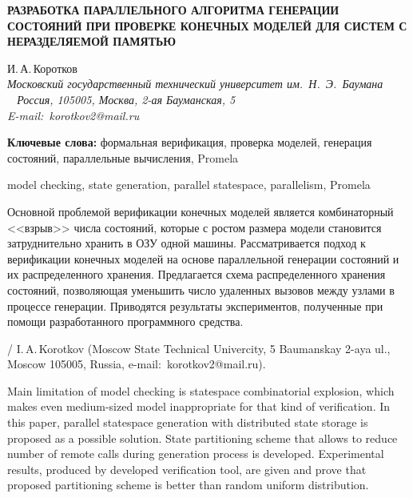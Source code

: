 \documentclass[12pt,a4paper,fleqn]{article}
\begin{document}
\begin{center}{ \fontsize{18pt}{23pt}\selectfont\bf РАЗРАБОТКА ПАРАЛЛЕЛЬНОГО АЛГОРИТМА ГЕНЕРАЦИИ СОСТОЯНИЙ ПРИ ПРОВЕРКЕ
    КОНЕЧНЫХ МОДЕЛЕЙ ДЛЯ СИСТЕМ С НЕРАЗДЕЛЯЕМОЙ ПАМЯТЬЮ}
\end{center}

\vspace{5mm}

\begin{center}
И.\,А.\,Коротков\\
\footnotesize\it Московский государственный технический университет им.~Н.~Э.~Баумана\\\
\rm
Россия, 105005, Москва, 2-ая Бауманская, 5\\
E-mail:~korotkov2@mail.ru

\hspace{1.25cm}

\vspace{8mm}

\begin{minipage}{12.16cm}\noindent

\footnotesize{\bf Ключевые слова:} формальная верификация, проверка моделей, генерация состояний, параллельные
вычисления, Promela

 model checking, state generation, parallel statespace, parallelism, Promela

\vspace{6mm}

\noindent Основной проблемой верификации конечных моделей является комбинаторный <<взрыв>> числа состояний, которые с
ростом размера модели становится затруднительно хранить в ОЗУ одной машины. Рассматривается подход к верификации
конечных моделей на основе параллельной генерации состояний и их распределенного хранения. Предлагается схема
распределенного хранения состояний, позволяющая уменьшить число удаленных вызовов между узлами в процессе
генерации. Приводятся результаты экспериментов, полученные при помощи разработанного программного средства.

\vspace{4mm}

 /
I.\,A.\,Korotkov (Moscow State Technical Univercity, 5 Baumanskay 2-aya ul., Moscow 105005, Russia,
e-mail:~korotkov2@mail.ru).

Main limitation of model checking is statespace combinatorial explosion, which makes even medium-sized model
inappropriate for that kind of verification. In this paper, parallel statespace generation with distributed state
storage is proposed as a possible solution. State partitioning scheme that allows to reduce number of remote calls
during generation process is developed.  Experimental results, produced by developed verification tool, are given and
prove that proposed partitioning scheme is better than random uniform distribution.
\end{minipage}

\end{center}
\end{document}

